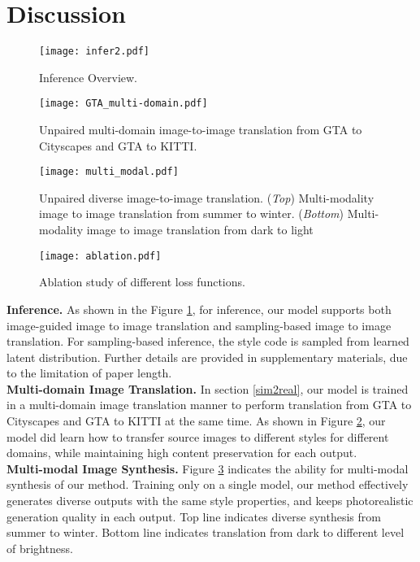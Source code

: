 \documentclass[runningheads]{llncs}
\begin{document}
\section{Discussion}
\begin{figure}
  \centering
  \texttt{[image: infer2.pdf]}
  \caption{Inference Overview.}
  \label{fig:inf}
\end{figure}
\begin{figure}
  \centering
  \texttt{[image: GTA\_multi-domain.pdf]}
  \caption{Unpaired multi-domain image-to-image translation from GTA\cite{richter2016playing} to Cityscapes\cite{cordts2016cityscapes} and GTA to KITTI\cite{geiger2015kitti}.}
  \label{fig:multi-domain}
\end{figure}
\begin{figure}
  \centering
  \texttt{[image: multi\_modal.pdf]}
  \caption{Unpaired diverse image-to-image translation. (\textit{Top}) Multi-modality image to image translation from summer to winter\cite{zhu2017unpaired}. (\textit{Bottom}) Multi-modality image to image translation from dark to light\cite{wei2018deep}}
  \label{fig:multi-modal}
\end{figure}
\begin{figure}
  \centering
  \texttt{[image: ablation.pdf]}
  \caption{Ablation study of different loss functions.}
  \label{fig:ablation}
\end{figure}
\noindent \textbf{Inference.}
As shown in the Figure \ref{fig:inf}, for inference, our model supports both image-guided image to image translation and sampling-based image to image translation. For sampling-based inference, the style code is sampled from learned latent distribution. Further details are provided in supplementary materials, due to the limitation of paper length.\\[0.5ex]
\noindent \textbf{Multi-domain Image Translation.} In section 
\ref{sim2real}, our model is trained in a multi-domain image translation manner to perform translation from GTA to Cityscapes and GTA to KITTI at the same time. As shown in  Figure \ref{fig:multi-domain}, our model did learn how to transfer source images to different styles for different domains, while maintaining high content preservation for each output.\\[0.5ex]
\noindent \textbf{Multi-modal Image Synthesis.} Figure \ref{fig:multi-modal} indicates the ability for multi-modal synthesis of our method. Training only on a single model, our method effectively generates diverse outputs with the same style properties, and keeps photorealistic generation quality in each output. Top line indicates diverse synthesis from summer to winter. Bottom line indicates translation from dark to different level of brightness. \\[0.5ex]
\end{document}
